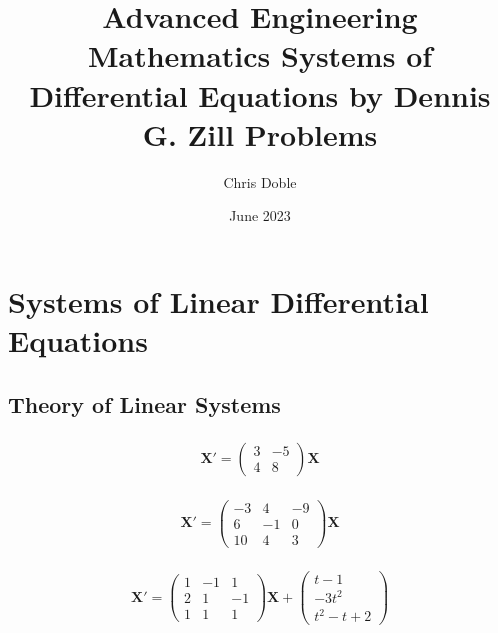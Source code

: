 \documentclass{article}
\title{Advanced Engineering Mathematics Systems of Differential Equations by Dennis G. Zill Problems}
\author{Chris Doble}
\date{June 2023}
\begin{document}
\maketitle

\tableofcontents

\setcounter{section}{9}
\section{Systems of Linear Differential Equations}

\subsection{Theory of Linear Systems}

\subsubsection{}

\[\mathbf{X}' = \begin{pmatrix}
    3 & -5 \\
    4 & 8
  \end{pmatrix} \mathbf{X}\]

\setcounter{subsubsection}{2}
\subsubsection{}

\[\mathbf{X}' = \begin{pmatrix}
    -3 & 4  & -9 \\
    6  & -1 & 0  \\
    10 & 4  & 3
  \end{pmatrix} \mathbf{X}\]

\setcounter{subsubsection}{4}
\subsubsection{}

\[\mathbf{X}' = \begin{pmatrix}
    1 & -1 & 1  \\
    2 & 1  & -1 \\
    1 & 1  & 1
  \end{pmatrix} \mathbf{X} + \begin{pmatrix}
    t - 1  \\
    -3 t^2 \\
    t^2 - t + 2
  \end{pmatrix}\]
\end{document}
